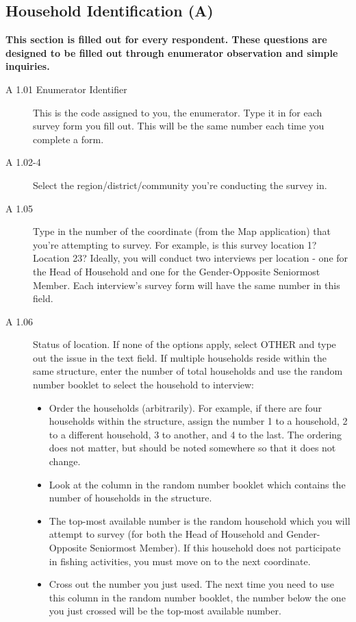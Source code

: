 \documentclass[a4paper]{refart}
\begin{document}
\subsection{Household Identification (A)}
\textbf{This section is filled out for every respondent. These questions are designed to be filled out through enumerator observation and simple inquiries.}


\begin{description}
\item[A 1.01 Enumerator Identifier] This is the code assigned to you, the enumerator. Type it in for each survey form you fill out. This will be the same number each time you complete a form.

\item[A 1.02-4] Select the region/district/community you're conducting the survey in.

\item[A 1.05] Type in the number of the coordinate (from the Map application) that you're attempting to survey. For example, is this survey location 1? Location 23? Ideally, you will conduct two interviews per location - one for the Head of Household and one for the Gender-Opposite Seniormost Member. Each interview's survey form will have the same number in this field.

\item[A 1.06] Status of location. If none of the options apply, select OTHER and type out the issue in the text field. If multiple households reside within the same structure, enter the number of total households and use the random number booklet to select the household to interview:
\begin{itemize}
\item Order the households (arbitrarily). For example, if there are four households within the structure, assign the number 1 to a household, 2 to a different household, 3 to another, and 4 to the last. The ordering does not matter, but should be noted somewhere so that it does not change.
\item Look at the column in the random number booklet which contains the number of households in the structure.
\item The top-most available number is the random household which you will attempt to survey (for both the Head of Household and Gender-Opposite Seniormost Member). If this household does not participate in fishing activities, you must move on to the next coordinate.
\item Cross out the number you just used. The next time you need to use this column in the random number booklet, the number below the one you just crossed will be the top-most available number.
\end{itemize}


\end{description}
\end{document}
